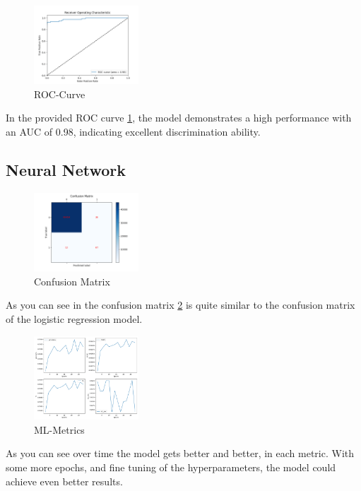 \documentclass[a4, 10 pt, conference]{ieeeconf}  %
\begin{document}
\begin{figure}[!htb]
  \centering
  \includegraphics[width=0.35\textwidth]{images/roc_curve.png}
  \caption{ROC-Curve}
  \label{fig:lr-roc}
\end{figure}
In the provided ROC curve \ref{fig:lr-roc}, the model demonstrates a high performance with an AUC of 0.98, indicating excellent discrimination ability.

\subsection{Neural Network}
\begin{figure}[!htb]
  \centering
  \includegraphics[width=0.35\textwidth]{images/ml_confusion.png}
  \caption{Confusion Matrix}
  \label{fig:ml-confusion}
\end{figure}
As you can see in the confusion matrix \ref{fig:ml-confusion} is quite similar to the confusion matrix of the logistic regression model.
\begin{figure}[!htb]
  \centering
  \includegraphics[width=0.35\textwidth]{images/ml.png}
  \caption{ML-Metrics}
  \label{fig:ml}
\end{figure}
As you can see over time the model gets better and better, in each metric. With some more epochs, and fine tuning of the hyperparameters, the model could achieve even better results.
\end{document}

